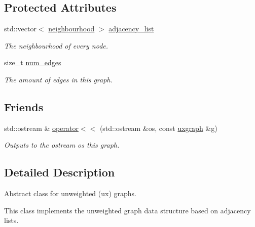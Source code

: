 \subsection*{Protected Attributes}
\begin{DoxyCompactItemize}
\item 
\mbox{\label{classlgraph_1_1xxgraph_a31cf82d0b20be05290be259dc97a51ec}} 
std\+::vector$<$ \hyperlink{namespacelgraph_a052e7766c13f3a43cec0aec8173fdede}{neighbourhood} $>$ \hyperlink{classlgraph_1_1xxgraph_a31cf82d0b20be05290be259dc97a51ec}{adjacency\+\_\+list}
\begin{DoxyCompactList}\small\item\em The neighbourhood of every node. \end{DoxyCompactList}\item 
\mbox{\label{classlgraph_1_1xxgraph_a6765a9a3be42f6e0f824635c593b35d7}} 
size\+\_\+t \hyperlink{classlgraph_1_1xxgraph_a6765a9a3be42f6e0f824635c593b35d7}{num\+\_\+edges}
\begin{DoxyCompactList}\small\item\em The amount of edges in this graph. \end{DoxyCompactList}\end{DoxyCompactItemize}
\subsection*{Friends}
\begin{DoxyCompactItemize}
\item 
std\+::ostream \& \hyperlink{classlgraph_1_1uxgraph_a74a84e077ff7034900deea3a89653d6c}{operator$<$$<$} (std\+::ostream \&os, const \hyperlink{classlgraph_1_1uxgraph}{uxgraph} \&g)
\begin{DoxyCompactList}\small\item\em Outputs to the ostream {\itshape os} this graph. \end{DoxyCompactList}\end{DoxyCompactItemize}


\subsection{Detailed Description}
Abstract class for unweighted (ux) graphs. 

This class implements the unweighted graph data structure based on adjacency lists. 

